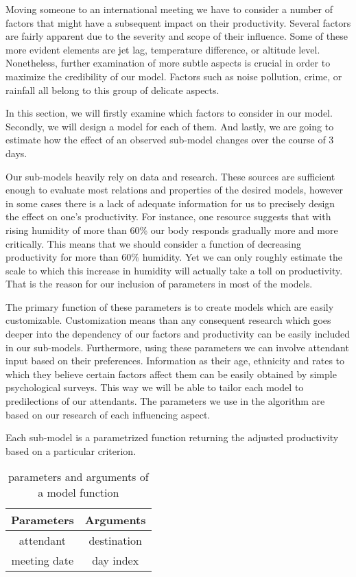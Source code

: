 
Moving someone to an international meeting we have to consider a number of factors that might have a subsequent impact on their productivity. Several factors are fairly apparent due to the severity and scope of their influence. Some of these more evident elements are jet lag, temperature difference, or altitude level. Nonetheless, further examination of more subtle aspects is crucial in order to maximize the credibility of our model. Factors such as noise pollution, crime, or rainfall all belong to this group of delicate aspects.

In this section, we will firstly examine which factors to consider in our model. Secondly, we will design a model for each of them. And lastly, we are going to estimate how the effect of an observed sub-model changes over the course of 3 days.

Our sub-models heavily rely on data and research. These sources are sufficient enough to evaluate most relations and properties of the desired models, however in some cases there is a lack of adequate information for us to precisely design the effect on one's productivity. For instance, one resource \cite{wiki-humidity_effect} suggests that with rising humidity of more than 60\% our body responds gradually more and more critically. This means that we should consider a function of decreasing productivity for more than 60\% humidity. Yet we can only roughly estimate the scale to which this increase in humidity will actually take a toll on productivity. That is the reason for our inclusion of parameters in most of the models.

The primary function of these parameters is to create models which are easily customizable. Customization means than any consequent research which goes deeper into the dependency of our factors and productivity can be easily included in our sub-models. Furthermore, using these parameters we can involve attendant input based on their preferences. Information as their age, ethnicity and rates to which they believe certain factors affect them can be easily obtained by simple psychological surveys. This way we will be able to tailor each model to predilections of our attendants. The parameters we use in the algorithm are based on our research of each influencing aspect.

Each sub-model is a parametrized function returning the adjusted productivity based on a particular criterion.

\begin{table}[h!]
\centering
\begin{tabular}{c|c}
Parameters & Arguments \\
\hline \hline
attendant & destination \\
meeting date & day index \\
\end{tabular}
\caption{parameters and arguments of a model function}
\label{table:model-function}
\end{table}

